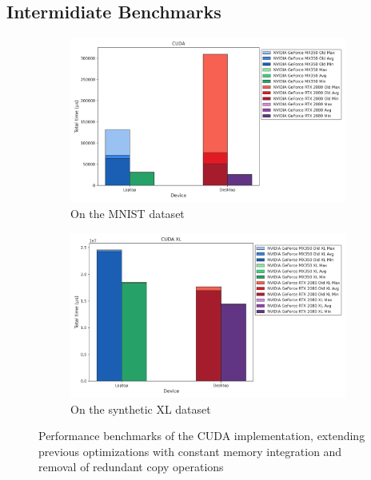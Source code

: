 \documentclass[modern,longauthor]{aastex7}
\begin{document}
\subsection{Intermidiate Benchmarks}\label{subsec:cuda-int-res-2}
\begin{figure}[htb!]
\centering
\begin{subfigure}{.5\textwidth}
  \centering
  \includegraphics[width=\linewidth]{CUDA/CUDA_copy_overhead_eliminiation.png}
  \caption{On the MNIST dataset}
\end{subfigure}%
\begin{subfigure}{.5\textwidth}
  \centering
  \includegraphics[width=\linewidth]{CUDA/CUDA XL_copy_overhead_elimination.png}
  \caption{On the synthetic XL dataset}
\end{subfigure}
\caption{Performance benchmarks of the CUDA implementation, extending previous optimizations with constant memory integration and removal of redundant copy operations}
\label{fig:cuda-intermediate-2}
\end{figure}
\end{document}
